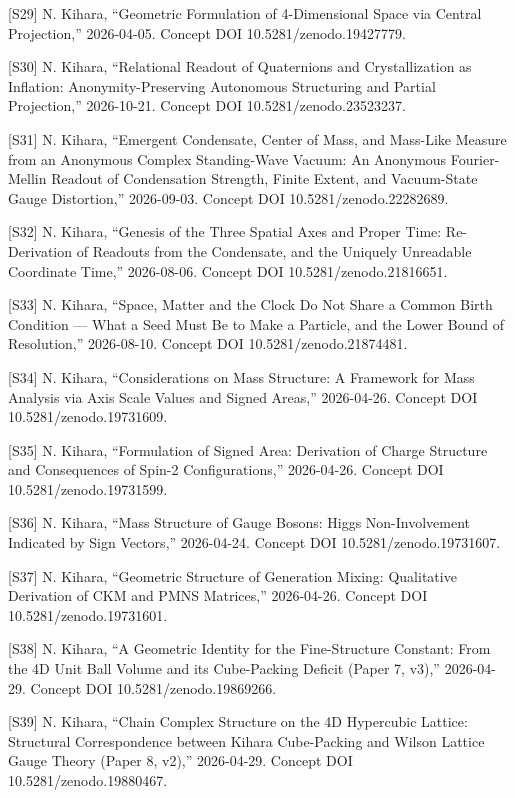 \documentclass[
  a4paper,
]{article}
\begin{document}
{[}S29{]} N. Kihara, ``Geometric Formulation of 4-Dimensional Space via
Central Projection,'' 2026-04-05. Concept DOI 10.5281/zenodo.19427779.

{[}S30{]} N. Kihara, ``Relational Readout of Quaternions and
Crystallization as Inflation: Anonymity-Preserving Autonomous
Structuring and Partial Projection,'' 2026-10-21. Concept DOI
10.5281/zenodo.23523237.

{[}S31{]} N. Kihara, ``Emergent Condensate, Center of Mass, and
Mass-Like Measure from an Anonymous Complex Standing-Wave Vacuum: An
Anonymous Fourier-Mellin Readout of Condensation Strength, Finite
Extent, and Vacuum-State Gauge Distortion,'' 2026-09-03. Concept DOI
10.5281/zenodo.22282689.

{[}S32{]} N. Kihara, ``Genesis of the Three Spatial Axes and Proper
Time: Re-Derivation of Readouts from the Condensate, and the Uniquely
Unreadable Coordinate Time,'' 2026-08-06. Concept DOI
10.5281/zenodo.21816651.

{[}S33{]} N. Kihara, ``Space, Matter and the Clock Do Not Share a Common
Birth Condition --- What a Seed Must Be to Make a Particle, and the
Lower Bound of Resolution,'' 2026-08-10. Concept DOI
10.5281/zenodo.21874481.

{[}S34{]} N. Kihara, ``Considerations on Mass Structure: A Framework for
Mass Analysis via Axis Scale Values and Signed Areas,'' 2026-04-26.
Concept DOI 10.5281/zenodo.19731609.

{[}S35{]} N. Kihara, ``Formulation of Signed Area: Derivation of Charge
Structure and Consequences of Spin-2 Configurations,'' 2026-04-26.
Concept DOI 10.5281/zenodo.19731599.

{[}S36{]} N. Kihara, ``Mass Structure of Gauge Bosons: Higgs
Non-Involvement Indicated by Sign Vectors,'' 2026-04-24. Concept DOI
10.5281/zenodo.19731607.

{[}S37{]} N. Kihara, ``Geometric Structure of Generation Mixing:
Qualitative Derivation of CKM and PMNS Matrices,'' 2026-04-26. Concept
DOI 10.5281/zenodo.19731601.

{[}S38{]} N. Kihara, ``A Geometric Identity for the Fine-Structure
Constant: From the 4D Unit Ball Volume and its Cube-Packing Deficit
(Paper 7, v3),'' 2026-04-29. Concept DOI 10.5281/zenodo.19869266.

{[}S39{]} N. Kihara, ``Chain Complex Structure on the 4D Hypercubic
Lattice: Structural Correspondence between Kihara Cube-Packing and
Wilson Lattice Gauge Theory (Paper 8, v2),'' 2026-04-29. Concept DOI
10.5281/zenodo.19880467.
\end{document}
